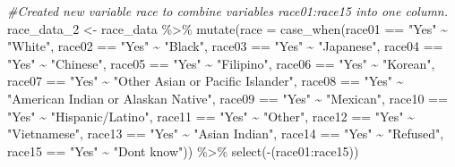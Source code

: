 \documentclass[
]{article}
\newenvironment{Shaded}{\begin{snugshade}}{\end{snugshade}}
\newcommand{\AttributeTok}[1]{\textcolor[rgb]{0.77,0.63,0.00}{#1}}
\newcommand{\CommentTok}[1]{\textcolor[rgb]{0.56,0.35,0.01}{\textit{#1}}}
\newcommand{\FunctionTok}[1]{\textcolor[rgb]{0.00,0.00,0.00}{#1}}
\newcommand{\NormalTok}[1]{#1}
\newcommand{\OtherTok}[1]{\textcolor[rgb]{0.56,0.35,0.01}{#1}}
\newcommand{\SpecialCharTok}[1]{\textcolor[rgb]{0.00,0.00,0.00}{#1}}
\newcommand{\StringTok}[1]{\textcolor[rgb]{0.31,0.60,0.02}{#1}}
\begin{document}
\begin{Shaded}
\begin{Highlighting}[]
\CommentTok{\#Created new variable \textasciigrave{}race\textasciigrave{} to combine variables race01:race15 into one column. }
\NormalTok{race\_data\_2 }\OtherTok{\textless{}{-}}\NormalTok{ race\_data }\SpecialCharTok{\%\textgreater{}\%}
  \FunctionTok{mutate}\NormalTok{(}\AttributeTok{race =} \FunctionTok{case\_when}\NormalTok{(race01 }\SpecialCharTok{==} \StringTok{"Yes"} \SpecialCharTok{\textasciitilde{}} \StringTok{"White"}\NormalTok{,}
\NormalTok{        race02 }\SpecialCharTok{==} \StringTok{"Yes"} \SpecialCharTok{\textasciitilde{}} \StringTok{"Black"}\NormalTok{,}
\NormalTok{        race03 }\SpecialCharTok{==} \StringTok{"Yes"} \SpecialCharTok{\textasciitilde{}} \StringTok{"Japanese"}\NormalTok{,}
\NormalTok{        race04 }\SpecialCharTok{==} \StringTok{"Yes"} \SpecialCharTok{\textasciitilde{}} \StringTok{"Chinese"}\NormalTok{,}
\NormalTok{        race05 }\SpecialCharTok{==} \StringTok{"Yes"} \SpecialCharTok{\textasciitilde{}} \StringTok{"Filipino"}\NormalTok{,}
\NormalTok{        race06 }\SpecialCharTok{==} \StringTok{"Yes"} \SpecialCharTok{\textasciitilde{}} \StringTok{"Korean"}\NormalTok{,}
\NormalTok{        race07 }\SpecialCharTok{==} \StringTok{"Yes"} \SpecialCharTok{\textasciitilde{}} \StringTok{"Other Asian or Pacific Islander"}\NormalTok{,}
\NormalTok{        race08 }\SpecialCharTok{==} \StringTok{"Yes"} \SpecialCharTok{\textasciitilde{}} \StringTok{"American Indian or Alaskan Native"}\NormalTok{,}
\NormalTok{        race09 }\SpecialCharTok{==} \StringTok{"Yes"} \SpecialCharTok{\textasciitilde{}} \StringTok{"Mexican"}\NormalTok{,}
\NormalTok{        race10 }\SpecialCharTok{==} \StringTok{"Yes"} \SpecialCharTok{\textasciitilde{}} \StringTok{"Hispanic/Latino"}\NormalTok{,}
\NormalTok{        race11 }\SpecialCharTok{==} \StringTok{"Yes"} \SpecialCharTok{\textasciitilde{}} \StringTok{"Other"}\NormalTok{,}
\NormalTok{        race12 }\SpecialCharTok{==} \StringTok{"Yes"} \SpecialCharTok{\textasciitilde{}} \StringTok{"Vietnamese"}\NormalTok{,}
\NormalTok{        race13 }\SpecialCharTok{==} \StringTok{"Yes"} \SpecialCharTok{\textasciitilde{}} \StringTok{"Asian Indian"}\NormalTok{,}
\NormalTok{        race14 }\SpecialCharTok{==} \StringTok{"Yes"} \SpecialCharTok{\textasciitilde{}} \StringTok{"Refused"}\NormalTok{,}
\NormalTok{        race15 }\SpecialCharTok{==} \StringTok{"Yes"} \SpecialCharTok{\textasciitilde{}} \StringTok{"Don\textquotesingle{}t know"}\NormalTok{)) }\SpecialCharTok{\%\textgreater{}\%}
  \FunctionTok{select}\NormalTok{(}\SpecialCharTok{{-}}\NormalTok{(race01}\SpecialCharTok{:}\NormalTok{race15))}


\end{Highlighting}
\end{Shaded}
\end{document}

